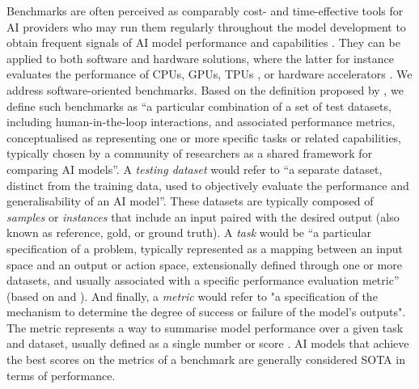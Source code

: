 Benchmarks are often perceived as comparably cost- and time-effective tools for AI providers who may run them regularly throughout the model development to obtain frequent signals of AI model performance and capabilities \cite{weidinger_sociotechnical_2023}. They can be applied to both software and hardware solutions, where the latter for instance evaluates the performance of CPUs, GPUs, TPUs \cite{Mattson2020}, or hardware accelerators \cite{Mattson2020b}. We address software-oriented benchmarks. Based on the definition proposed by \citet{raji2021}, we define such benchmarks as “a particular combination of a set of test datasets, including human-in-the-loop interactions, and associated performance metrics, conceptualised as representing one or more specific tasks or related capabilities, typically chosen by a community of researchers as a shared framework for comparing AI models”. A \textit{testing dataset} would refer to “a separate dataset, distinct from the training data, used to objectively evaluate the performance and generalisability of an AI model”. These datasets are typically composed of \textit{samples} or \textit{instances} that include an input paired with the desired output (also known as reference, gold, or ground truth). A \textit{task} would be “a particular specification of a problem, typically represented as a mapping between an input space and an output or action space, extensionally defined through one or more datasets, and usually associated with a specific performance evaluation metric” (based on \cite{raji2021} and \cite{schlangen_targeting_2020}). And finally, a \textit{metric} would refer to "a specification of the mechanism to determine the degree of success or failure of the model's outputs". The metric represents a way to summarise model performance over a given task and dataset, usually defined as a single number or score \cite{raji2021}. AI models that achieve the best scores on the metrics of a benchmark are generally considered SOTA in terms of performance. 

